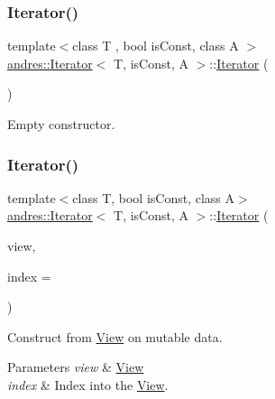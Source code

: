 \subsubsection{\texorpdfstring{Iterator()}{Iterator()}\hspace{0.1cm}{\footnotesize\ttfamily [1/5]}}
{\footnotesize\ttfamily template$<$class T , bool is\+Const, class A $>$ \\
\hyperlink{classandres_1_1Iterator}{andres\+::\+Iterator}$<$ T, is\+Const, A $>$\+::\hyperlink{classandres_1_1Iterator}{Iterator} (\begin{DoxyParamCaption}{ }\end{DoxyParamCaption})\hspace{0.3cm}{\ttfamily [inline]}}



Empty constructor. 

\mbox{\label{classandres_1_1Iterator_a7b3a9873e6c06df90bd70a0262c90de1}} 
\subsubsection{\texorpdfstring{Iterator()}{Iterator()}\hspace{0.1cm}{\footnotesize\ttfamily [2/5]}}
{\footnotesize\ttfamily template$<$class T, bool is\+Const, class A$>$ \\
\hyperlink{classandres_1_1Iterator}{andres\+::\+Iterator}$<$ T, is\+Const, A $>$\+::\hyperlink{classandres_1_1Iterator}{Iterator} (\begin{DoxyParamCaption}\item[{const \hyperlink{classandres_1_1View}{View}$<$ T, false, A $>$ \&}]{view,  }\item[{const std\+::size\+\_\+t}]{index = {} }\end{DoxyParamCaption})\hspace{0.3cm}{\ttfamily [inline]}}

Construct from \hyperlink{classandres_1_1View}{View} on mutable data.


\begin{DoxyParams}{Parameters}
{\em view} & \hyperlink{classandres_1_1View}{View} \\
\hline
{\em index} & Index into the \hyperlink{classandres_1_1View}{View}. \\
\hline
\end{DoxyParams}
\mbox{\label{classandres_1_1Iterator_a182a2080c203da0d9a92045e12c0ac9d}} 
